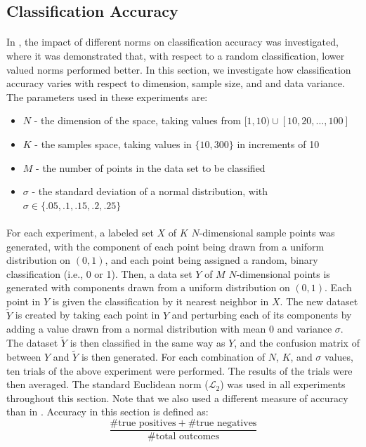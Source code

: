 \documentclass{article}
\begin{document}
\subsection{Classification Accuracy}
\paragraph{}
In \cite{aggarwal2001surprising}, the impact of different norms on classification accuracy was investigated, where it was demonstrated that, with respect to a random classification, lower valued norms performed better. In this section, we investigate how classification accuracy varies with respect to dimension, sample size, and and data variance. The parameters used in these experiments are:
\begin{itemize}
\item $N$ - the dimension of the space, taking values from $[1,10)\cup[10,20,\ldots,100]$
\item $K$ - the samples space, taking values in $\{10,300\}$ in increments of 10
\item $M$ - the number of points in the data set to be classified
\item $\sigma$ - the standard deviation of a normal distribution, with $\sigma\in\{.05,.1,.15,.2,.25\}$
\end{itemize}
\paragraph{}
For each experiment, a labeled set $X$ of $K$ $N$-dimensional sample points was generated, with the component of each point being drawn from a uniform distribution on $(0,1)$, and each point being assigned a random, binary classification (i.e., 0 or 1). Then, a data set $Y$ of $M$ $N$-dimensional points is generated with components drawn  from a uniform distribution on $(0,1)$. Each point in $Y$ is given the classification by it nearest neighbor in $X$. The new dataset $\tilde{Y}$ is created by taking each point in $Y$ and perturbing each of its components by adding a value drawn from a normal distribution with mean $0$ and variance $\sigma$. The dataset $\tilde{Y}$ is then classified in the same way as $Y$, and the confusion matrix of between $Y$ and $\tilde{Y}$ is then generated.
For each combination of $N$, $K$, and $\sigma$ values, ten trials of the above experiment were performed. The results of the trials were then averaged. The standard Euclidean norm ($\mathcal{L}_2$) was used in all experiments throughout this section. Note that we also used a different measure of accuracy than in \cite{aggarwal2001surprising}. Accuracy in this section is defined as:
$$
	\dfrac{\#\textrm{true positives}+\#\textrm{true negatives}}{\#\textrm{total outcomes}}
$$
\end{document}
